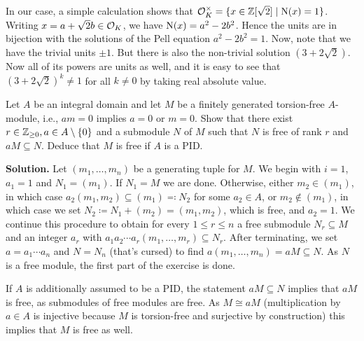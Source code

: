 \documentclass[a4paper,11pt]{article}
\begin{document}
In our case, a simple calculation shows that $\mathcal{O}_K^\times = \{x \in 
\mathbb{Z}[\sqrt 2] \mid \operatorname{N}(x) = 1\}$. Writing $x = a + \sqrt 2 b \in \mathcal{O}_K$, we have
$\operatorname{N}(x) = a^2 - 2b^2$. Hence the units are in bijection with the solutions of
the Pell equation $a^2 - 2b^2 = 1$. Now, note that we have the trivial units $\pm 1$.
But there is also the non-trivial solution $(3 + 2\sqrt 2)$. Now all of its powers
are units as well, and it is easy to see that $(3 + 2 \sqrt 2)^k \neq 
1$ for all $k \neq 0$ by taking real absolute value. 


Let $A$ be an integral domain and let $M$ be a finitely generated torsion-free $A$-module, i.e., $am = 0$ implies $a = 0$ or $m = 0$. Show that there exist $r \in \mathbb{Z}_{\geq 0}, a \in A\setminus \{0\}$ and a submodule $N$ of $M$ such that $N$ is free
of rank $r$ and $aM \subseteq N$. Deduce that $M$ is free if $A$ is a PID.

\textbf{Solution.} Let $(m_1, \dots, m_n)$ be a generating tuple for $M$. We begin
with $i = 1$, $a_1 = 1$ and $N_1 = (m_1)$. If $N_1 = M$ we are done.
Otherwise, either $m_2 \in (m_1)$, in which
case $a_2(m_1, m_2) \subseteq (m_1) \eqqcolon N_2$ for some $a_2 \in A$, or $m_2
\not \in (m_1)$, in which case we set $N_2 \coloneqq N_1 + (m_2) = (m_1, m_2)$, which
is free, and $a_2 = 1$. We continue this procedure to obtain
for every $1 \leq r \leq n$ a free submodule $N_r \subseteq M$ and an integer $a_r$
with $a_1a_2 \cdots a_r (m_1, \dots, m_r) \subseteq N_r$. After terminating, we set 
$a = a_1 \cdots a_n$ and $N = N_n$ (that's cursed) to find $a(m_1,
\dots, m_n) = aM \subseteq N$. As $N$ is a free module, the first part of the
exercise is done. 

If $A$ is additionally assumed to be a PID, the statement $aM \subseteq N$
implies that $aM$ is free, as submodules of free modules are free. As $M \cong
aM$ (multiplication by $a \in A$ is injective because $M$ is torsion-free and
surjective by construction) this implies that $M$ is free as well.


\contactend
\end{document}
